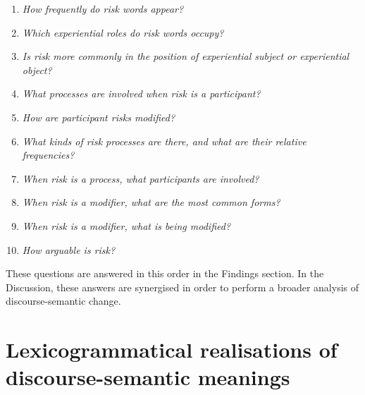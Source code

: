 \begin{enumerate}\setlength\itemsep{-0.5em}
\item \emph{How frequently do risk words appear?}
\item \emph{Which experiential roles do risk words occupy?}
\item \emph{Is risk more commonly in the position of experiential subject or experiential object?}
\item \emph{What processes are involved when risk is a participant?}
\item \emph{How are participant risks modified?}
\item \emph{What kinds of risk processes are there, and what are their relative frequencies?}
\item \emph{When risk is a process, what participants are involved?}
\item \emph{When risk is a modifier, what are the most common forms?}
\item \emph{When risk is a modifier, what is being modified?}
\item \emph{How arguable is risk?} \label{lst:num}
\end{enumerate}
%
These questions are answered in this order in the Findings section. In the Discussion, these answers are synergised in order to perform a broader analysis of discourse-semantic change.

\section{Lexicogrammatical realisations of discourse-semantic meanings}

